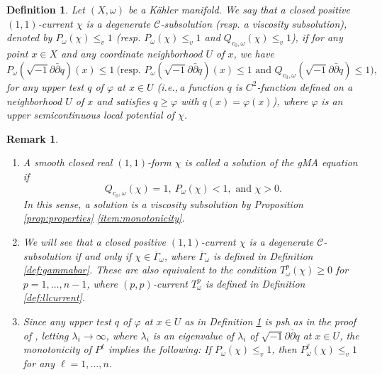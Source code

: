 \documentclass[10pt,a4paper]{amsart}
\numberwithin{equation}{section}
\newtheorem{defn}[equation]{Definition}
\newtheorem{remark}[equation]{Remark}
\newcommand{\delb}{\sqrt{-1}\partial\bar{\partial}}
\begin{document}
\begin{defn}\label{defn:vsub}
    Let $(X,\omega)$ be a K{\"a}hler manifold. 
    We say that a closed positive $(1,1)$-current $\chi$ is a degenerate $\mathcal{C}$-subsolution (resp. a viscosity subsolution), denoted by $P_\omega(\chi)\le_v1$ (resp. $P_\omega(\chi)\le_v1$ and $Q_{c_0,\omega}(\chi)\le_v1$), if for any point $x\in X$ and any coordinate neighborhood $U$ of $x$, we have  
    $$P_\omega(\delb q)(x)\le 1\ \bigg( \text{resp. } P_\omega(\delb q)(x)\le 1 \text{ and } Q_{c_0,\omega}(\delb q)\le1\bigg),$$
    for any upper test $q$ of $\varphi$ at $x \in U$ (i.e.,\,a function $q$ is $C^2$-function defined on a neighborhood $U$ of $x$ and satisfies $q\ge\varphi$ with $q(x)=\varphi(x)$),
    where $\varphi$ is an upper semicontinuous local potential of $\chi$.
\end{defn}

\begin{remark}\label{rem:visc}
    \begin{enumerate}[label={\upshape(\roman*)}]
        \item A smooth closed real $(1,1)$-form $\chi$ is called a solution of the gMA equation if
        \begin{equation*}
            Q_{c_0,\omega}(\chi)=1,\ P_\omega(\chi)<1, \text{ and } \chi>0.
        \end{equation*}
        In this sense,  a solution is a viscosity subsolution by Proposition \ref{prop:properties} \ref{item:monotonicity}.
        \item We will see that a closed positive $(1,1)$-current $\chi$ is a degenerate $\mathcal{C}$-subsolution if and only if $\chi\in\overline{\Gamma}_\omega$, where $\overline{\Gamma}_\omega$ is defined in Definition \ref{def:gammabar}. These are also equivalent to the condition $T^p_\omega(\chi)\ge0$ for $p=1,\dots,n-1$, where $(p,p)$-current $T^p_\omega$ is defined in Definition \ref{def:llcurrent}. 
        \item\label{item:monovisc} Since any upper test $q$ of $\varphi$ at $x\in U$ as in Definition \ref{defn:vsub} is psh as in the proof of \cite[Proposition 1.3]{EGZ}, letting $\lambda_i\to\infty$, where $\lambda_i$ is an eigenvalue of $\lambda_i$ of $\delb q$ at $x\in U$, the monotonicity of $P^\ell$ implies the following: If $P_\omega(\chi)\le_v1$, then $P^\ell_\omega(\chi)\le_v1$ for any $\ell=1,\dots,n$.
    \end{enumerate}
\end{remark}
\end{document}
